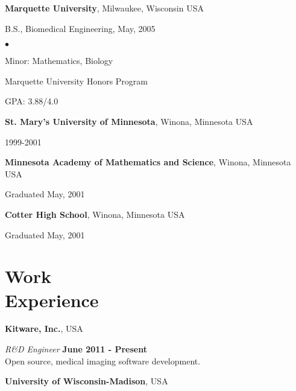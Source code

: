 \documentclass[margin,line]{res}
\newenvironment{list1}{
  \begin{list}{\ding{113}}{%
      \setlength{\itemsep}{0in}
      \setlength{\parsep}{0in} \setlength{\parskip}{0in}
      \setlength{\topsep}{0in} \setlength{\partopsep}{0in}
      \setlength{\leftmargin}{0.17in}}}{\end{list}}
\newenvironment{list2}{
  \begin{list}{$\bullet$}{%
      \setlength{\itemsep}{0in}
      \setlength{\parsep}{0in} \setlength{\parskip}{0in}
      \setlength{\topsep}{0in} \setlength{\partopsep}{0in}
      \setlength{\leftmargin}{0.2in}}}{\end{list}}
\begin{document}
\begin{resume}
{\bf Marquette University}, Milwaukee, Wisconsin USA\\
\vspace*{-.1in}
\begin{list1}
\item[] B.S., Biomedical Engineering,  May, 2005

\begin{list2}
 \vspace*{.05in}
 \item Minor: Mathematics, Biology
 \item Marquette University Honors Program
 \item GPA: 3.88/4.0
\end{list2}
\end{list1}

{\bf St. Mary's University of Minnesota}, Winona, Minnesota USA\\
\vspace*{-.1in}
\begin{list1}
\item[] 1999-2001
\end{list1}


{\bf Minnesota Academy of Mathematics and Science}, Winona, Minnesota USA\\
\vspace*{-.1in}
\begin{list1}
\item[] Graduated May, 2001
\end{list1}

{\bf Cotter High School}, Winona, Minnesota USA\\
\vspace*{-.1in}
\begin{list1}
\item[] Graduated May, 2001
\end{list1}

\section{\sc Work\\ Experience}

{\bf Kitware, Inc.}, USA

\vspace{-.3cm}
{\em R\&D Engineer} \hfill {\bf June 2011 - Present} \\
Open source, medical imaging software development.

{\bf University of Wisconsin-Madison}, USA


\end{resume}
\end{document}
